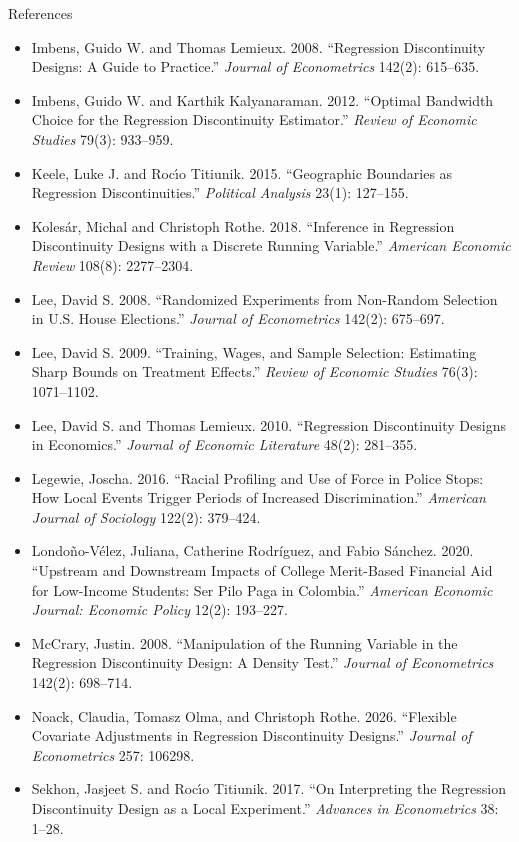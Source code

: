 \documentclass[aspectratio=169,11pt,xcolor=dvipsnames]{beamer}
\begin{document}
\begin{frame}[allowframebreaks,t]{References}
\begin{itemize}
Treatment Effect Heterogeneity.'' \textit{Quantitative Economics} 15(4): 1035--1064.
\item Imbens, Guido W. and Thomas Lemieux. 2008. ``Regression Discontinuity
Designs: A Guide to Practice.'' \textit{Journal of Econometrics} 142(2): 615--635.
\item Imbens, Guido W. and Karthik Kalyanaraman. 2012. ``Optimal Bandwidth Choice
for the Regression Discontinuity Estimator.'' \textit{Review of Economic Studies}
79(3): 933--959.
\item Keele, Luke J. and Roc\'{\i}o Titiunik. 2015. ``Geographic Boundaries as
Regression Discontinuities.'' \textit{Political Analysis} 23(1): 127--155.
\item Kolesár, Michal and Christoph Rothe. 2018. ``Inference in Regression
Discontinuity Designs with a Discrete Running Variable.'' \textit{American
Economic Review} 108(8): 2277--2304.
\item Lee, David S. 2008. ``Randomized Experiments from Non-Random Selection in
U.S. House Elections.'' \textit{Journal of Econometrics} 142(2): 675--697.
\item Lee, David S. 2009. ``Training, Wages, and Sample Selection: Estimating
Sharp Bounds on Treatment Effects.'' \textit{Review of Economic Studies} 76(3):
1071--1102.
\item Lee, David S. and Thomas Lemieux. 2010. ``Regression Discontinuity Designs
in Economics.'' \textit{Journal of Economic Literature} 48(2): 281--355.
\item Legewie, Joscha. 2016. ``Racial Profiling and Use of Force in Police Stops:
How Local Events Trigger Periods of Increased Discrimination.'' \textit{American
Journal of Sociology} 122(2): 379--424.
\item Londoño-Vélez, Juliana, Catherine Rodríguez, and Fabio Sánchez. 2020. ``Upstream
and Downstream Impacts of College Merit-Based Financial Aid for Low-Income Students:
Ser Pilo Paga in Colombia.'' \textit{American Economic Journal: Economic Policy}
12(2): 193--227.
\item McCrary, Justin. 2008. ``Manipulation of the Running Variable in the
Regression Discontinuity Design: A Density Test.'' \textit{Journal of
Econometrics} 142(2): 698--714.
\item Noack, Claudia, Tomasz Olma, and Christoph Rothe. 2026. ``Flexible Covariate
Adjustments in Regression Discontinuity Designs.'' \textit{Journal of
Econometrics} 257: 106298.
\item Sekhon, Jasjeet S. and Roc\'{\i}o Titiunik. 2017. ``On Interpreting the
Regression Discontinuity Design as a Local Experiment.'' \textit{Advances in
Econometrics} 38: 1--28.
\end{itemize}
\end{frame}
\end{document}
